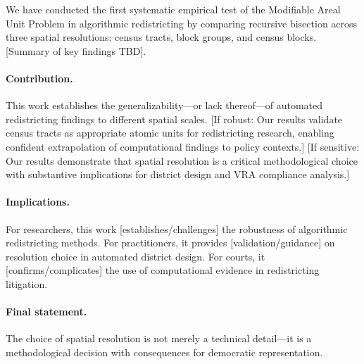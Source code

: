 
We have conducted the first systematic empirical test of the Modifiable Areal Unit Problem in algorithmic redistricting by comparing recursive bisection across three spatial resolutions: census tracts, block groups, and census blocks. [Summary of key findings TBD].

\paragraph{Contribution.} This work establishes the generalizability---or lack thereof---of automated redistricting findings to different spatial scales. [If robust: Our results validate census tracts as appropriate atomic units for redistricting research, enabling confident extrapolation of computational findings to policy contexts.] [If sensitive: Our results demonstrate that spatial resolution is a critical methodological choice with substantive implications for district design and VRA compliance analysis.]

\paragraph{Implications.} For researchers, this work [establishes/challenges] the robustness of algorithmic redistricting methods. For practitioners, it provides [validation/guidance] on resolution choice in automated district design. For courts, it [confirms/complicates] the use of computational evidence in redistricting litigation.

\paragraph{Final statement.} The choice of spatial resolution is not merely a technical detail---it is a methodological decision with consequences for democratic representation.
